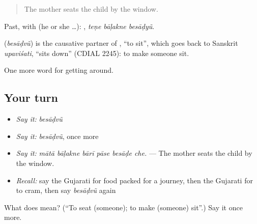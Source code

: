 \begin{quote}
The mother seats the child by the window.
\end{quote}

Past, with  (he or she …):   , \emph{teṇe bāḷakne besāḍyũ}.

\begin{cousinweb}
\textbf{} (\emph{besāḍvũ}) is the causative partner of , \textquotedblleft{}to sit\textquotedblright{}, which goes back to Sanskrit \emph{upaviśati}, \textquotedblleft{}sits down\textquotedblright{} (CDIAL 2245): to make someone sit.
\end{cousinweb}

\begin{grammarlens}[title={What you've built}]
One more word for getting around.
\end{grammarlens}

\subsection*{Your turn}
\begin{itemize}
\raggedright
  \item \emph{Say it:} \emph{besāḍvũ}
  \item \emph{Say it:} \emph{besāḍvũ}, once more
  \item \emph{Say it:} \emph{mātā bāḷakne bārī pāse besāḍe che.} — The mother seats the child by the window.
  \item \emph{Recall:} say the Gujarati for food packed for a journey, then the Gujarati for to cram, then say \emph{besāḍvũ} again
\end{itemize}

\begin{tcolorbox}[breakable,colback=teal!4,colframe=teal!35!black,title={Before you move on}]
What does  mean? (\textquotedblleft{}To seat (someone); to make (someone) sit\textquotedblright{}.) Say it once more.
\end{tcolorbox}
